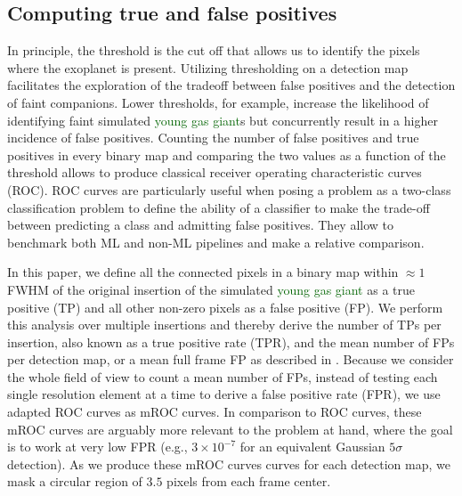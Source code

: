 \documentclass{aa}
\newcommand{\newchange}[1]{\textcolor{darkgreen}{#1}}
\begin{document}
\subsection{Computing true and false positives}
\label{sec:TPFP}

In principle, the threshold is the cut off that allows us to identify the pixels where the exoplanet is present.
Utilizing thresholding on a detection map facilitates the exploration of the tradeoff between false positives and the detection of faint companions. Lower thresholds, for example, increase the likelihood of identifying faint simulated \newchange{young gas giant}s but concurrently result in a higher incidence of false positives.
Counting the number of false positives and true positives in every binary map and comparing the two values as a function of the threshold allows to produce classical receiver operating characteristic curves (ROC). 
ROC curves are particularly useful when posing a problem as a two-class classification problem to define the ability of a classifier to make the trade-off between predicting a class and admitting false positives.
They allow to benchmark both ML and non-ML pipelines and make a relative comparison. 

In this paper, we define all the connected pixels in a binary map within $\approx 1$ FWHM of the original insertion of the simulated \newchange{young gas giant} as a true positive (TP) and all other non-zero pixels as a false positive (FP). We perform this analysis over multiple insertions and thereby derive the number of TPs per insertion, also known as a true positive rate (TPR), and the mean number of FPs per detection map, or a mean full frame FP as described in \citet{2018Gomez}. Because we consider the whole field of view to count a mean number of FPs, instead of testing each single resolution element at a time to derive a false positive rate (FPR), we use adapted ROC curves as mROC curves. In comparison to ROC curves, these mROC curves are arguably more relevant to the problem at hand, where the goal is to work at very low FPR (e.g., $3\times 10^{-7}$ for an equivalent Gaussian $5\sigma$ detection). As we produce these mROC curves  curves for each detection map, we mask a circular region of $3.5$ pixels from each frame center.
\end{document}
